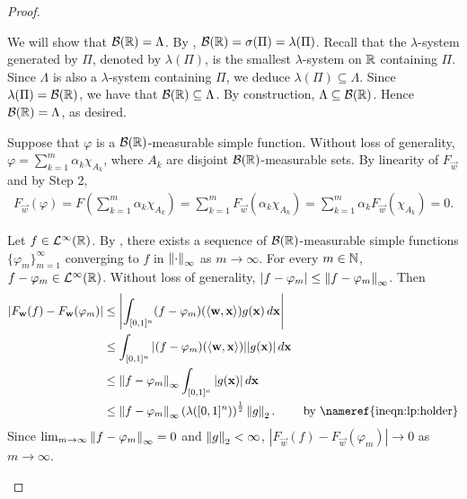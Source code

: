 \begin{proof}
\begin{step}
We will show that ${\mathcal B}({\mathbb R}) = \Lambda$. By , ${\mathcal B}({\mathbb R}) = \sigma(\Pi) = \lambda(\Pi)$.
Recall that the $\lambda$-system generated by $\Pi$, denoted by $\lambda(\Pi)$, is the smallest $\lambda$-system on ${\mathbb R}$ containing $\Pi$. Since $\Lambda$ is also a $\lambda$-system containing $\Pi$, we deduce $\lambda(\Pi) \subseteq \Lambda$. Since $\lambda(\Pi) = {\mathcal B}({\mathbb R})$, we have that ${\mathcal B}({\mathbb R}) \subseteq \Lambda$. By construction, $\Lambda \subseteq {\mathcal B}({\mathbb R})$. Hence ${\mathcal B}({\mathbb R}) = \Lambda$, as desired.
\end{step}
\begin{step}
Suppose that $\varphi$ is a ${\mathcal B}({\mathbb R})$-measurable simple function. Without loss of generality, $\varphi = \sum_{k=1}^m \alpha_k \chi_{A_k} $, where $A_k$ are disjoint ${\mathcal B}({\mathbb R})$-measurable sets. By linearity of $F_\vec{w}$ and by Step 2,
\begin{align}
    \label{eqn:universality:l2:vanishhyper:simple}
    F_{\vec{w}}(\varphi) = F \left (\sum_{k=1}^m \alpha_k \chi_{A_k} \right ) = \sum_{k=1}^m F_{\vec{w}}(\alpha_k \chi_{A_k}) =  \sum_{k=1}^m  \alpha_k F_{\vec{w}}( \chi_{A_k}) = 0.
\end{align}
\end{step}
\pagebreak
\begin{step}
Let $f \in {\mathcal {L}^\infty}({\mathbb R})$. By , there exists a sequence of ${\mathcal B}({\mathbb R})$-measurable simple functions $\{ \varphi_m \}_{m=1}^\infty$ converging to $f$ in $\left\lVert\cdot\right\rVert_\infty$ as $m \to \infty$. For every $m \in {\mathbb N}$, $f - \varphi_m \in {\mathcal {L}^\infty}({\mathbb R})$. Without loss of generality, $| f - \varphi_m | \leq \left\lVert f - \varphi_m\right\rVert_\infty$. 
Then \begin{align*}
    \left | F_{\vec{w}}(f) - F_{\vec{w}}(\varphi_m) \right | &\leq \left | \int_{[0,1]^n} (f - \varphi_m) ( \langle \vec{w}, \vec{x} \rangle) g(\vec{x}) \, d \vec{x} \right | & \\
    & \leq \int_{[0,1]^n} |  (f - \varphi_m) ( \langle \vec{w}, \vec{x} \rangle) | | g(\vec{x}) | \, d \vec{x} &\\
    & \leq \norm{f - \varphi_m}_\infty \int_{[0,1]^n}  | g(\vec{x}) | \, d \vec{x} &\\
    & \leq  \norm{f - \varphi_m}_\infty \left(\lambda([0,1]^n)\right)^{\frac{1}{2}} \norm{g}_2. & \text{by \nameref{ineqn:lp:holder}}
\end{align*}
Since $\lim_{m \to \infty}  \left\lVert f - \varphi_m\right\rVert_\infty = 0$ and $\left\lVert g\right\rVert_2 < \infty$, $\left | F_{\vec{w}}(f) - F_{\vec{w}}(\varphi_m) \right | \to 0$ as $m \to \infty$.

\end{step}
\end{proof}
